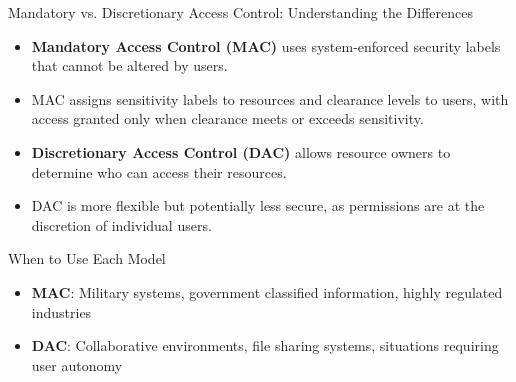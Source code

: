 \documentclass{beamer}
\begin{document}
\begin{frame}{Mandatory vs. Discretionary Access Control: Understanding the Differences}
    \begin{itemize}
        \item \textbf{Mandatory Access Control (MAC)} uses system-enforced security labels that cannot be altered by users.
        \item MAC assigns sensitivity labels to resources and clearance levels to users, with access granted only when clearance meets or exceeds sensitivity.
        \item \textbf{Discretionary Access Control (DAC)} allows resource owners to determine who can access their resources.
        \item DAC is more flexible but potentially less secure, as permissions are at the discretion of individual users.
    \end{itemize}
    
    \begin{block}{When to Use Each Model}
        \begin{itemize}
            \item \textbf{MAC}: Military systems, government classified information, highly regulated industries
            \item \textbf{DAC}: Collaborative environments, file sharing systems, situations requiring user autonomy
        \end{itemize}
    \end{block}
\end{frame}
\end{document}

